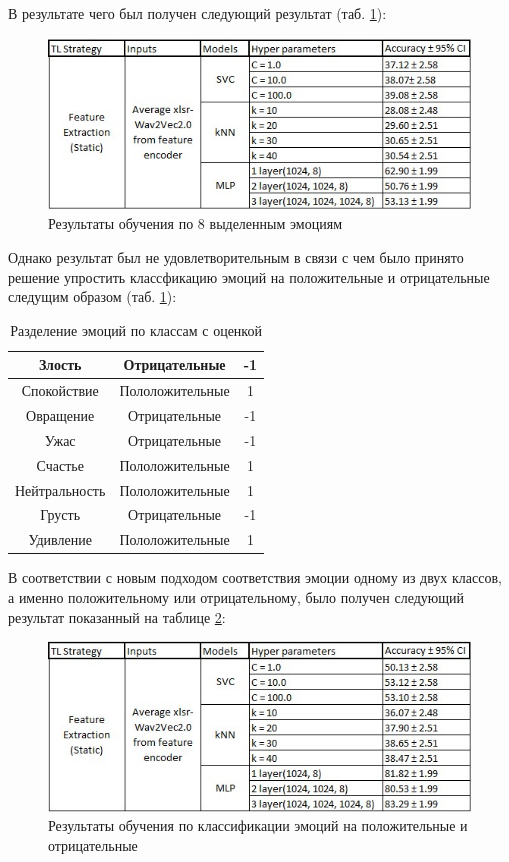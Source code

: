 В результате чего был получен следующий результат (таб. \ref{pic:table}): 

\begin{figure}[h]
\includegraphics[width=0.75\columnwidth]{./img/table_all_em.jpg}
\centering
\caption{Результаты обучения по 8 выделенным эмоциям}
\label{pic:table}
\end{figure}

Однако результат был не удовлетворительным в связи с чем было принято решение 
упростить классфикацию эмоций на положительные и отрицательные следущим образом (таб. \ref{tbl:em_table}):

\begin{table}[H]
\caption{Разделение эмоций по классам с оценкой}
\label{tbl:em_table}
\begin{center}

\begin{tabular}{ | c | c | c | }
  \hline
  Злость & Отрицательные & -1 \\ \hline 
  Спокойствие & Пололожительные & 1 \\ \hline 
  Овращение & Отрицательные & -1 \\ \hline 
  Ужас & Отрицательные & -1 \\ \hline 
  Счастье & Пололожительные & 1 \\ \hline 
  Нейтральность & Пололожительные & 1 \\ \hline 
  Грусть & Отрицательные & -1 \\ \hline 
  Удивление & Пололожительные & 1 \\ \hline 
\end{tabular}
\end{center}
\end{table}

В соответствии с новым подходом соответствия эмоции одному из двух классов, а именно 
положительному или отрицательному, было получен следующий результат показанный на таблице \ref{pic:table2}:

\begin{figure}[h]
\includegraphics[width=0.75\columnwidth]{./img/table_2_em.jpg}
\centering
\caption{Результаты обучения по классификации эмоций на положительные и отрицательные}
\label{pic:table2}
\end{figure}

